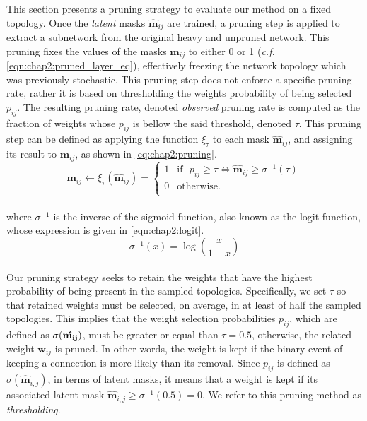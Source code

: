 This section presents a pruning strategy to evaluate our method on a fixed
topology. Once the \emph{latent} masks $\bm{\hat{m}}_{ij}$ are trained, a
pruning step is applied to extract a subnetwork from the original heavy and
unpruned network. This pruning fixes the values of the masks $\bm{m}_{ij}$ to
either 0 or 1 (\emph{c.f.} \cref{eqn:chap2:pruned_layer_eq}), effectively
freezing the network topology which was previously stochastic. This pruning step
does not enforce a specific pruning rate, rather it is based on thresholding the
weights probability of being selected $p_{ij}$. The resulting pruning rate,
denoted \emph{observed} pruning rate is computed as the fraction of weights
whose $p_{ij}$ is bellow the said threshold, denoted $\tau$. This pruning step
can be defined as applying the function $\xi_\tau$ to each mask
$\bm{\hat{m}}_{ij}$, and assigning its result to $\bm{m}_{ij}$, as shown in
\cref{eq:chap2:pruning}.\\

\begin{equation}
  \bm{m}_{ij} \leftarrow \xi_\tau(\bm{\hat{m}}_{ij}) =
  \left\{
  \begin{array}{ll}
    1 & \text{if~~}  p_{ij} \geq \tau \Leftrightarrow  \bm{\hat{m}}_{ij} \geq \sigma^{-1}(\tau) \\
    0 & \text{otherwise.}                                                                       \\
  \end{array}
  \right.
  \label{eq:chap2:pruning}
\end{equation}\\

\noindent where $\sigma^{-1}$ is the inverse of the sigmoid function, also known
as the logit function, whose expression is given in \cref{eqn:chap2:logit}.\\

\begin{equation}
  \sigma^{-1}(x) = \log\left(\frac{x}{1-x}\right)
  \label{eqn:chap2:logit}
\end{equation}\\

Our pruning strategy seeks to retain the weights that have the highest
probability of being present in the sampled topologies. Specifically, we set
$\tau$ so that retained weights must be selected, on average, in at least of
half the sampled topologies. This implies that the weight selection
probabilities $p_{ij}$, which are defined as $\sigma(\bf{\hat{m_{ij}}})$, must
be greater or equal than $\tau=0.5$, otherwise, the related weight $\bm{w}_{ij}$
is pruned. In other words, the weight is kept if the binary event of keeping a
connection is more likely than its removal. Since $p_{ij}$ is defined as
$\sigma(\bm{\hat{m}}_{i,j})$, in terms of latent masks, it means that a weight
is kept if its associated latent mask $\bm{\hat{m}}_{i,j} \geq
\sigma^{-1}(0.5)=0$. We refer to this pruning method as \textit{thresholding}.\\


